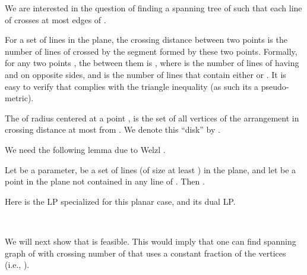 \documentclass[12pt]{article}
\newcommand{\PntSet}{P}
\newcommand{\pnt}{\mathsf{p}}
\newcommand{\pntA}{\mathsf{q}}
\newcommand{\pairsX}[1]{\mathrm{E}\pth[]{#1}}
\newcommand{\Term}[1]{\textsf{#1}}
\newcommand{\LP}{\Term{L{}P}\xspace}
\begin{document}
We are interested in the question of finding a spanning tree  of
 such that each line of  crosses at most
 edges of .





\begin{defn}
    For a set of lines  in the plane, the crossing distance
    between two points is the number of lines of  crossed by
    the segment formed by these two points. Formally, for any two
    points , the 
    between them is , where 
    is the number of lines of  having  and  on
    opposite sides, and  is the number of lines that contain either
     or . It is easy to verify that
     complies with the triangle inequality (as
    such its a pseudo-metric).
    
    The  of radius  centered at a point
    , is the set of all vertices of the arrangement 
     in crossing distance at most  from . We
    denote this ``disk'' by .
\end{defn}

We need the following lemma due to Welzl \cite{w-stlcn-92}.
\begin{lemma}
    Let  be a parameter,  be a set of lines (of
    size at least ) in the plane, and let  be a point in the
    plane not contained in any line of . Then
    .

\end{lemma}

Here is the \LP {} specialized for this planar case,
and its dual \LP.

\medskip

\noindent{}~~
\fbox{\begin{minipage}{0.45\linewidth}
-0.75cm]
    & 
    \hspace{4cm}
    \forall \pnt \pntA \in
    \pairsX{\PntSet} 
    \hspace{-4cm}
    \
\end{minipage}}

\medskip

We will next show that  is feasible. This
would imply that one can find spanning graph of  with
crossing number of  that uses a constant fraction of the
vertices (i.e., ).
\end{document}
